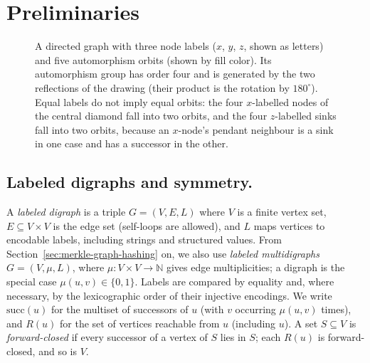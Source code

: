 \documentclass[twoside,leqno]{article}
\newcommand{\Succ}{\mathrm{succ}}
\newcommand{\Reach}{R}
\begin{document}
\section{Preliminaries}
\label{sec:preliminaries}

\begin{figure}[!t]
\centering
{}
\caption{A directed graph with three node labels ($x$, $y$, $z$, shown as letters) and five automorphism orbits (shown by fill color). Its automorphism group has order four and is generated by the two reflections of the drawing (their product is the rotation by $180^\circ$). Equal labels do not imply equal orbits: the four $x$-labelled nodes of the central diamond fall into two orbits, and the four $z$-labelled sinks fall into two orbits, because an $x$-node's pendant neighbour is a sink in one case and has a successor in the other.}
\label{fig:orbitexample}
\end{figure}

\subsection{Labeled digraphs and symmetry.}
A \emph{labeled digraph} is a triple $G=(V,E,L)$ where $V$ is a finite vertex set, $E \subseteq V \times V$ is the edge set (self-loops are allowed), and $L$ maps vertices to encodable labels, including strings and structured values. From Section~\ref{sec:merkle-graph-hashing} on, we also use \emph{labeled multidigraphs} $G=(V,\mu,L)$, where $\mu : V\times V \to \mathbb{N}$ gives edge multiplicities; a digraph is the special case $\mu(u,v)\in\{0,1\}$. Labels are compared by equality and, where necessary, by the lexicographic order of their injective encodings. We write $\Succ(u)$ for the multiset of successors of $u$ (with $v$ occurring $\mu(u,v)$ times), and $\Reach(u)$ for the set of vertices reachable from $u$ (including $u$). A set $S \subseteq V$ is \emph{forward-closed} if every successor of a vertex of $S$ lies in $S$; each $\Reach(u)$ is forward-closed, and so is $V$.
\end{document}
